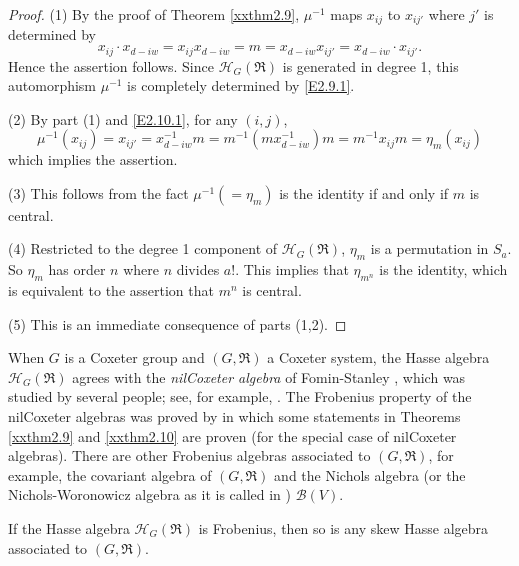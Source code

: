 \begin{proof}
(1) By the proof of Theorem \ref{xxthm2.9}, 
$\mu^{-1}$ maps $x_{ij}$ to $x_{ij'}$ where $j'$ is determined by
\begin{equation}
\label{E2.10.1}\tag{E2.10.1}
x_{ij} \cdot x_{d-i w}=x_{ij} x_{d-i w} =m =x_{d-i w} x_{i j'}=x_{d-i w} 
\cdot x_{i j'}.
\end{equation}
Hence the assertion follows. Since ${\mathcal H}_G(\Re)$ is generated in degree 1, 
this automorphism $\mu^{-1}$ is completely determined by \eqref{E2.9.1}.

(2) 
By part (1) and \eqref{E2.10.1}, for any $(i,j)$, 
$$\mu^{-1}(x_{ij})=x_{ij'}=
x_{d-iw}^{-1} m=m^{-1} (m x_{d-iw}^{-1})m=m^{-1} x_{ij} m=
\eta_{m}(x_{ij})$$
which implies the assertion.

(3) This follows from the fact $\mu^{-1}(=\eta_{m})$ is the identity
if and only if $m$ is central.

(4) Restricted to the degree 1 component of ${\mathcal H}_G(\Re)$,
$\eta_{m}$ is a permutation in $S_a$. So $\eta_{m}$ has order
$n$ where $n$ divides $a!$. This implies that $\eta_{m^n}$
is the identity, which is equivalent to the assertion that
$m^n$ is central.

(5) This is an immediate consequence of parts (1,2). 
\end{proof}

When $G$ is a Coxeter group and $(G,\Re)$ a Coxeter
system, the Hasse algebra ${\mathcal H}_G(\Re)$ agrees with the
{\it nilCoxeter algebra} of Fomin-Stanley \cite{FS}, which  was 
studied by several people;  see, for example, \cite{Al, Ba, KM}. 
The Frobenius property of the nilCoxeter algebras was proved by
\cite{Al} in which some statements in Theorems \ref{xxthm2.9} 
and \ref{xxthm2.10} are proven (for the special case of 
nilCoxeter algebras).
There are other Frobenius algebras associated 
to $(G,\Re)$, for example, the covariant algebra of $(G,\Re)$ and 
the Nichols algebra (or the Nichols-Woronowicz algebra as it is called 
in \cite{Ba, KM, MS}) ${\mathcal B}(V)$. 

\begin{theorem}
\label{xxthm2.11}
If the Hasse algebra ${\mathcal H}_G(\Re)$ is Frobenius, then so is 
any skew Hasse algebra associated to $(G,\Re)$.
\end{theorem}

